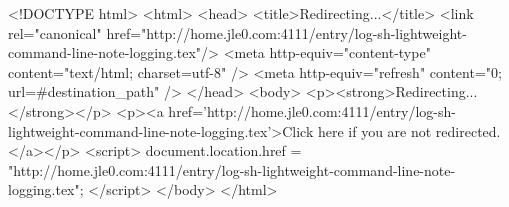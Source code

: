 <!DOCTYPE html>
<html>
<head>
<title>Redirecting...</title>
<link rel="canonical" href="http://home.jle0.com:4111/entry/log-sh-lightweight-command-line-note-logging.tex"/>
<meta http-equiv="content-type" content="text/html; charset=utf-8" />
<meta http-equiv="refresh" content="0; url=#{destination_path}" />
</head>
<body>
  <p><strong>Redirecting...</strong></p>
  <p><a href='http://home.jle0.com:4111/entry/log-sh-lightweight-command-line-note-logging.tex'>Click here if you are not redirected.</a></p>
  <script>
    document.location.href = "http://home.jle0.com:4111/entry/log-sh-lightweight-command-line-note-logging.tex";
  </script>
</body>
</html>
